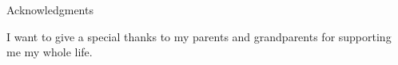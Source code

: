 \thispagestyle{empty}

\vspace*{20mm}

\begin{center}
{ Acknowledgments}
\end{center}

\vspace{10mm}
I want to give a special thanks to my parents and grandparents for supporting me my whole life. 

\cleardoublepage{}
